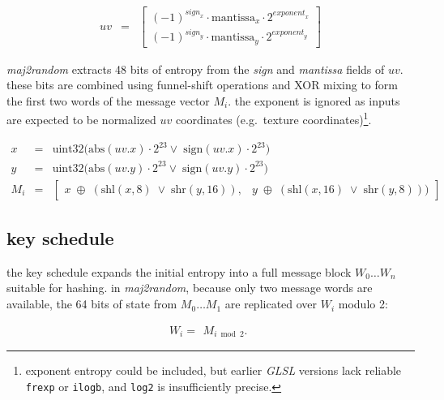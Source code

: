 \documentclass{scrartcl}
\begin{document}
\[
\begin{array}{rcl}
uv & = &
\begin{bmatrix}
  (-1)^{\mathit{sign}_x} \cdot \mathrm{mantissa}_x \cdot 2^{\mathit{exponent}_x} \\
  (-1)^{\mathit{sign}_y} \cdot \mathrm{mantissa}_y \cdot 2^{\mathit{exponent}_y}
\end{bmatrix}
\end{array}
\]

\vspace{1em}

\noindent
\textit{maj2random} extracts 48 bits of entropy from the \emph{sign} and
\emph{mantissa} fields of $uv$. these bits are combined using funnel-shift
operations and XOR mixing to form the first two words of the message vector
$M_i$. the exponent is ignored as inputs are expected to be normalized $uv$
coordinates (e.g.\ texture coordinates)\footnote{exponent entropy could be
included, but earlier \emph{GLSL} versions lack reliable \texttt{frexp} or
\texttt{ilogb}, and \texttt{log2} is insufficiently precise.}.

\[
\begin{array}{rcl}
x & = & \mathrm{uint32}\Big( \mathrm{abs}(\mathit{uv.x}) \cdot 2^{23} \lor \;
        \mathrm{sign}(\mathit{uv.x}) \cdot 2^{23} \Big) \\
y & = & \mathrm{uint32}\Big( \mathrm{abs}(\mathit{uv.y}) \cdot 2^{23} \lor \;
        \mathrm{sign}(\mathit{uv.y}) \cdot 2^{23} \Big) \\[1em]
M_i & = &
\begin{bmatrix}
x \; \oplus \; (\mathrm{shl}(x, 8) \; \lor \; \mathrm{shr}(y, 16)), &
y \; \oplus \; (\mathrm{shl}(x, 16) \; \lor \; \mathrm{shr}(y, 8)))
\end{bmatrix}
\end{array}
\]

\vspace{1em}

\subsection*{key schedule}

\noindent
the key schedule expands the initial entropy into a full message block
$W_0\dots W_n$ suitable for hashing. in \textit{maj2random}, because
only two message words are available, the 64 bits of state from
$M_0\dots M_1$ are replicated over $W_i$ modulo 2:

\[
W_i =
\begin{array}{ll}
M_{i \bmod 2}.
\end{array}
\]
\end{document}
